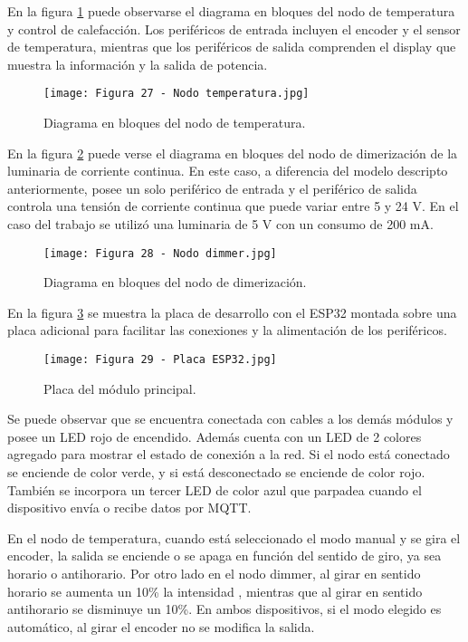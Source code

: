 En la figura \ref{fig:27} puede observarse el diagrama en bloques del nodo de temperatura y control de calefacción. Los periféricos de entrada incluyen el encoder y el sensor de temperatura, mientras que los periféricos de salida comprenden el display que muestra la información y la salida de potencia.

\begin{figure}[h]
\centering
\texttt{[image: Figura 27 - Nodo temperatura.jpg]}
\caption[Nodo de temperatura]{Diagrama en bloques del nodo de temperatura.}
\label{fig:27}
\end{figure}

En la figura \ref{fig:28} puede verse el diagrama en bloques del nodo de dimerización de la luminaria de corriente continua. En este caso, a diferencia del modelo descripto anteriormente, posee un solo periférico de entrada y el periférico de salida controla una tensión de corriente continua que puede variar entre 5 y 24 V. En el caso del trabajo se utilizó una luminaria de 5 V con un consumo de 200 mA.

\begin{figure}[h]
\centering
\texttt{[image: Figura 28 - Nodo dimmer.jpg]}
\caption[Nodo dimmer]{Diagrama en bloques del nodo de dimerización.}
\label{fig:28}
\end{figure}

\newpage
En la figura \ref{fig:29} se muestra la placa de desarrollo con el ESP32 montada sobre una placa adicional para facilitar las conexiones y la alimentación de los periféricos. 

\begin{figure}[h]
\centering
\texttt{[image: Figura 29 - Placa ESP32.jpg]}
\caption[Módulo principal]{Placa del módulo principal.}
\label{fig:29}
\end{figure}

Se puede observar que se encuentra conectada con cables a los demás módulos y posee un LED rojo de encendido. Además cuenta con un LED de 2 colores agregado para mostrar el estado de conexión a la red. Si el nodo está conectado se enciende de color verde, y si está desconectado se enciende de color rojo. También se incorpora un tercer LED de color azul que parpadea cuando el dispositivo envía o recibe datos por MQTT.

En el nodo de temperatura, cuando está seleccionado el modo manual y se gira el encoder, la salida se enciende o se apaga en función del sentido de giro, ya sea horario o antihorario. Por otro lado en el nodo dimmer, al girar en sentido horario se aumenta un 10\% la intensidad , mientras que al girar en sentido antihorario se disminuye un 10\%. En ambos dispositivos, si el modo elegido es automático, al girar el encoder no se modifica la salida.

